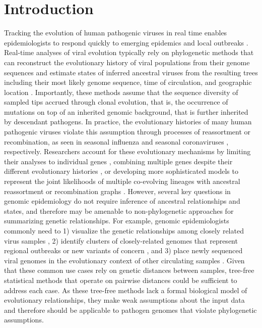 \documentclass[webpdf,contemporary,large,single]{oup-authoring-template}%
\theoremstyle{thmstyleone}%
\theoremstyle{thmstyletwo}%
\theoremstyle{thmstylethree}%
\begin{document}
\section{Introduction}

Tracking the evolution of human pathogenic viruses in real time enables epidemiologists to respond quickly to emerging epidemics and local outbreaks \citep{Grubaugh2019}.
Real-time analyses of viral evolution typically rely on phylogenetic methods that can reconstruct the evolutionary history of viral populations from their genome sequences and estimate states of inferred ancestral viruses from the resulting trees including their most likely genome sequence, time of circulation, and geographic location \citep{Volz2013,Baele2017,Sagulenko2018}.
Importantly, these methods assume that the sequence diversity of sampled tips accrued through clonal evolution, that is, the occurrence of mutations on top of an inherited genomic background, that is further inherited by descendant pathogens.
In practice, the evolutionary histories of many human pathogenic viruses violate this assumption through processes of reassortment or recombination, as seen in seasonal influenza \citep{Nelson2008,Marshall2013} and seasonal coronaviruses \citep{Su2016}, respectively.
Researchers account for these evolutionary mechanisms by limiting their analyses to individual genes \citep{Lemey2007,Bhatt2011}, combining multiple genes despite their different evolutionary histories \citep{Wiens1998}, or developing more sophisticated models to represent the joint likelihoods of multiple co-evolving lineages with ancestral reassortment or recombination graphs \citep{Barrat-Charlaix2022,Muller2022}.
However, several key questions in genomic epidemiology do not require inference of ancestral relationships and states, and therefore may be amenable to non-phylogenetic approaches for summarizing genetic relationships.
For example, genomic epidemiologists commonly need to 1) visualize the genetic relationships among closely related virus samples \citep{Argimon2016,Campbell2021}, 2) identify clusters of closely-related genomes that represent regional outbreaks or new variants of concern \citep{OToole2022,McBroome2022,Stoddard2022,Tran-Kiem2023}, and 3) place newly sequenced viral genomes in the evolutionary context of other circulating samples \citep{OToole2021,Turakhia2021,Aksamentov2021}.
Given that these common use cases rely on genetic distances between samples, tree-free statistical methods that operate on pairwise distances could be sufficient to address each case.
As these tree-free methods lack a formal biological model of evolutionary relationships, they make weak assumptions about the input data and therefore should be applicable to pathogen genomes that violate phylogenetic assumptions.
\end{document}
